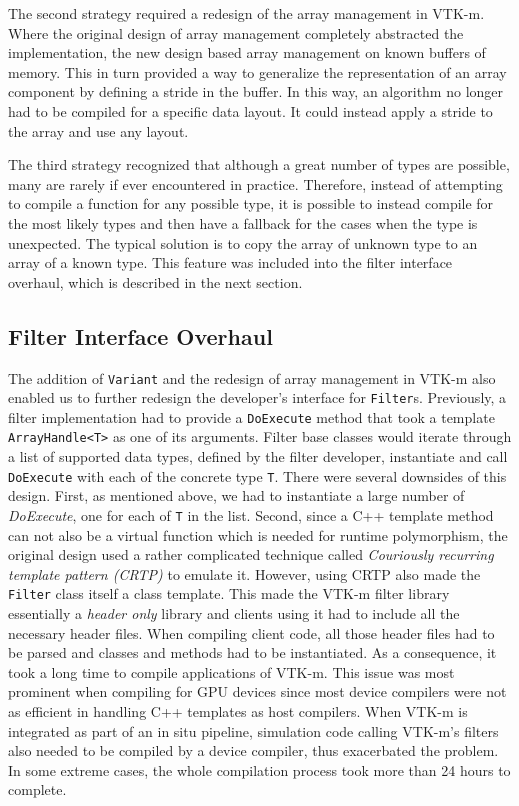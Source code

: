 The second strategy required a redesign of the array management in VTK-m.
Where the original design of array management completely abstracted the implementation, the new design based array management on known buffers of memory.
This in turn provided a way to generalize the representation of an array component by defining a stride in the buffer.
In this way, an algorithm no longer had to be compiled for a specific data layout.
It could instead apply a stride to the array and use any layout.

The third strategy recognized that although a great number of types are possible, many are rarely if ever encountered in practice.
Therefore, instead of attempting to compile a function for any possible type, it is possible to instead compile for the most likely types and then have a fallback for the cases when the type is unexpected.
The typical solution is to copy the array of unknown type to an array of a known type.
This feature was included into the filter interface overhaul, which is described in the next section.

\subsection{Filter Interface Overhaul}


The addition of \texttt{Variant} and the redesign of array management in VTK-m also enabled us to further redesign the developer's interface for \texttt{Filter}s. Previously, a filter implementation had to provide a \texttt{DoExecute} method that took a template \texttt{ArrayHandle<T>} as one of its arguments. Filter base classes would iterate through a list of supported data types, defined by the filter developer, instantiate and call \texttt{DoExecute} with each of the concrete type \texttt{T}. There were several downsides of this design. First, as mentioned above, we had to instantiate a large number of \textit{DoExecute}, one for each of \texttt{T} in the list. Second, since a C++ template method can not also be a virtual function which is needed for runtime polymorphism, the original design used a rather complicated technique called \emph{Couriously recurring template pattern (CRTP)} to emulate it. However, using CRTP also made the \texttt{Filter} class itself a class template. This made the VTK-m filter library essentially a \emph{header only} library and clients using it had to include all the necessary header files. When compiling client code, all those header files had to be parsed and classes and methods had to be instantiated. As a consequence, it took a long time to compile applications of VTK-m. This issue was most prominent when compiling for GPU devices since most device compilers were not as efficient in handling C++ templates as host compilers. When VTK-m is integrated as part of an in situ pipeline, simulation code calling VTK-m's filters also needed to be compiled by a device compiler, thus exacerbated the problem. In some extreme cases, the whole compilation process took more than 24 hours to complete.

